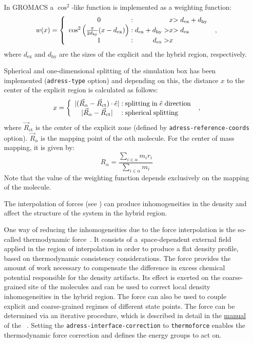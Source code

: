 In GROMACS a $\cos^2$-like function is implemented as a weighting function:
\begin{equation}
w(x)=
\left\{\begin{array}{c@{\;:\;}r@{x}l}
0&&>d_\mathrm{ex}+d_\mathrm{hy}\\
\cos^2\left(\frac{\pi}{2d_\mathrm{hy}}(x-d_\mathrm{ex})\right)&d_\mathrm{ex}+d_\mathrm{hy}>&>d_\mathrm{ex}\\
1&d_\mathrm{ex}>&
\end{array}\right.~,
\label{equ:wf}
\end{equation}
where $d_\mathrm{ex}$ and $d_\mathrm{hy}$ are the sizes of the explicit and the hybrid region, respectively.

Spherical and one-dimensional splitting  of the simulation box has been implemented ({\tt adress-type} option)
and depending on this, the distance $x$ to the center of the explicit region is calculated as follows:
\begin{equation}
x=
\left\{
\begin{array}{c@{\;:\;}l}
  |(\vec{R}_\alpha-\vec{R}_\mathrm{ct})\cdot\hat{e}|&\mathrm{splitting\;in\;}\hat{e}\mathrm{\;direction}\\
|\vec{R}_\alpha-\vec{R}_\mathrm{ct}|&\mathrm{spherical\;splitting}
\end{array}
\right.~,
\end{equation}
where $\vec{R}_\mathrm{ct}$ is the center of the explicit zone (defined by {\tt adress-reference-coords} option). $\vec{R}_\alpha$ is the mapping point of the $\alpha$th molecule. For the center of mass mapping, it is given by:
\begin{equation}
R_\alpha=\frac{\sum_{i\in\alpha}m_i r_i}{\sum_{i\in\alpha}m_i}
\label{equ:com-def}
\end{equation}
Note that the value of the weighting function depends exclusively on the mapping of the molecule.

The interpolation of forces (see ) can produce inhomogeneities in the density and affect the structure of the system in the hybrid region.

One way of reducing the inhomogeneities due to the force interpolation is the so-called thermodynamic force~\cite{Poblete2010}.
It consists of a~space-dependent external field applied in the region of interpolation in order to produce a flat density profile, based on thermodynamic consistency considerations. The force provides the amount of work necessary to compensate the difference in excess chemical potential responsible for the density artifacts.
Its effect is exerted on the coarse-grained site of the molecules and can be used to correct local density inhomogeneities in the hybrid region.
The force can also be used to couple explicit and coarse-grained regimes of different state points.
The force can be determined via an iterative procedure, which is described in detail in the \href{http://code.google.com/p/votca/downloads/list?&q=manual}{manual} of the ~\cite{ruehle2009}. Setting the {\tt adress-interface-correction} to {\tt thermoforce} enables the thermodynamic force correction and defines the energy groups to act on.

